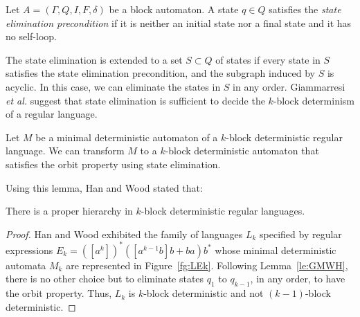 \documentclass{llncs}
\begin{document}
\begin{definition}
	Let $A = (\Gamma, Q, I, F, \delta)$ be a block automaton.
	A state $q \in Q$ satisfies the \emph{state elimination precondition} if it is neither an initial state nor a final state and it has no self-loop.
\end{definition}

	The state elimination is extended to a set $S \subset Q$ of states if every state in $S$ satisfies the state elimination precondition, and the subgraph induced by $S$ is acyclic. In this case, we can eliminate the states in $S$ in any order. Giammarresi \emph{et al.} \cite{GMW01} suggest that state elimination is sufficient to decide the $k$-block determinism of a regular language.

\begin{lemma}\label{le:GMWH}
	Let $M$ be a minimal deterministic automaton of a $k$-block deterministic regular language. We can transform $M$ to a $k$-block deterministic automaton that satisfies the orbit property using state elimination.
\end{lemma}

Using this lemma, Han and Wood stated that:

\begin{theorem}[\cite{HW08}]\label{th:HW}
	There is a proper hierarchy in $k$-block deterministic regular languages.
\end{theorem}
\begin{proof}
	Han and Wood exhibited the family of languages $L_k$ specified by regular expressions $E_k = ([a^k])^*([a^{k-1}b]b + ba)b^*$ whose minimal deterministic automata $M_k$ are represented in Figure~\ref{fg:LEk}.
	Following Lemma~\ref{le:GMWH}, there is no other choice but to eliminate states $q_1$ to $q_{k-1}$, in any order, to have the orbit property.
	Thus, $L_k$ is $k$-block deterministic and not $(k-1)$-block deterministic.
\end{proof}
\end{document}
